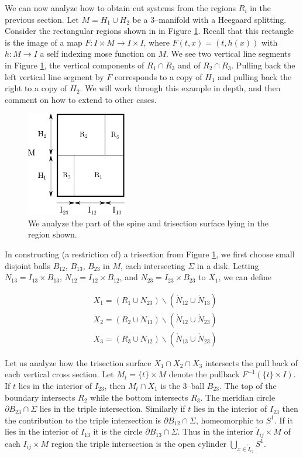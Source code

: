\documentclass[12pt]{amsart}
\newcommand{\del}{\partial }
\theoremstyle{definition}
\theoremstyle{remark}
\begin{document}
We can now analyze how to obtain cut systems from the regions $R_i$ in the previous section.  Let $M = H_1 \cup H_2$ be a 3--manifold with a Heegaard splitting.  Consider the rectangular regions shown in in Figure \ref{sectionbreakdown}.  Recall that this rectangle is the image of a map $F\colon I \times M \to I \times I$, where $F(t,x) = (t,h(x))$ with $h\colon M \to I$ a self indexing mose function on $M$.  We see two vertical line segments in Figure \ref{sectionbreakdown}, the vertical components of $R_1 \cap R_3$ and of $R_2 \cap R_3$.  Pulling back the left vertical line segment by $F$ corresponds to a copy of $H_1$ and pulling back the right to a copy of $H_2$.  We will work through this example in depth, and then comment on how to extend to other cases.  

\begin{figure}[h]
\centering
\includegraphics[height=1.8in]{MxS1_section.png}
\caption{We analyze the part of the spine and trisection surface lying in the region shown.}
\label{sectionbreakdown}
\end{figure}

In constructing (a restriction of) a trisection from Figure \ref{sectionbreakdown}, we first choose small disjoint balls $B_{12}$, $B_{13}$, $B_{23}$ in $M$, each intersecting $\Sigma$ in a disk.  Letting $N_{13} = I_{13} \times B_{13}$, $N_{12} = I_{12} \times B_{12}$, and $N_{23} = I_{23} \times B_{23}$ to $X_1$, we can define

\begin{align*}
&X_1 = (R_1 \cup N_{23}) \backslash (\mathring N_{12} \cup \mathring N_{13}) \\
&X_2 = (R_2 \cup N_{13}) \backslash (\mathring N_{12} \cup \mathring N_{23}) \\
&X_3 = (R_3 \cup N_{12}) \backslash (\mathring N_{13} \cup \mathring N_{23}) 
\end{align*}

Let us analyze how the trisection surface $X_1 \cap X_2 \cap X_3$ intersects the pull back of each vertical cross section.  Let $M_t = \{t\} \times M$ denote the pullback $F^{-1}(\{t\} \times I)$.  If $t$ lies in the interior of $I_{23}$, then $M_t \cap X_1$ is the 3--ball $B_{23}$.  The top of the boundary intersects $R_2$ while the bottom intersects $R_3$.  The meridian circle $\del B_{23} \cap \Sigma$ lies in the triple intersection.  Similarly if $t$ lies in the interior of $I_{23}$ then the contribution to the triple intersection is $\del B_{12} \cap \Sigma$, homeomorphic to $S^1$.  If it lies in the interior of $I_{13}$ it is the circle $\del B_{13} \cap \Sigma$.  Thus in the interior $\mathring I_{ij} \times M$ of each $I_{ij} \times M$ region the triple intersection is the open cylinder $\bigcup_{x \in \mathring I_{ij}} S^1$.  
\end{document}
